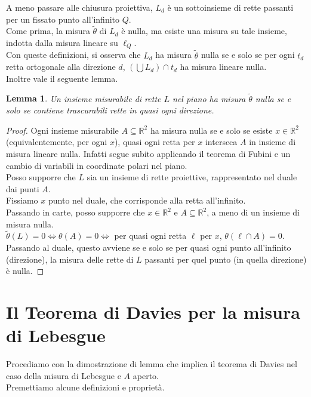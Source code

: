 \documentclass[a4paper, twoside,openright]{article}
\newcommand{\LRa}{\Leftrightarrow}
\newcommand{\R}{\mathbb{R}}
\newcommand{\<}{\langle}
\renewcommand{\>}{\rangle}
\newtheorem{lemma}[teo]{Lemma}
\begin{document}
A meno passare alle chiusura proiettiva, $L_{d}$ è un sottoinsieme di rette passanti per un fissato punto all'infinito $Q$.\\
Come prima, la misura $\tilde \theta$ di $L_d$ è nulla, ma esiste una misura su tale insieme, indotta dalla misura lineare su $\ell_Q$.\\
Con queste definizioni, si osserva che $L_d$ ha misura $\tilde \theta$ nulla se e solo se per ogni $t_d$ retta ortogonale alla direzione $d$, $ (\bigcup L_d) \cap t_d$ ha misura lineare nulla.\\
Inoltre vale il seguente lemma.

\begin{lemma}
	Un insieme misurabile di rette $L$ nel piano ha misura $\tilde \theta$ nulla se e solo se contiene trascurabili rette in quasi ogni direzione. 
\end{lemma}

\begin{proof}
	Ogni insieme misurabile $A \subseteq \R^2$ ha misura nulla se e solo se esiste $x \in \R^2$ (equivalentemente, per ogni $x$), quasi ogni retta per $x$ interseca $A$ in insieme di misura lineare nulla. Infatti segue subito applicando il teorema di Fubini e un cambio di variabili in coordinate polari nel piano.\\
	Posso supporre che $L$ sia un insieme di rette proiettive, rappresentato nel duale dai punti $A$.\\
	Fissiamo $x$ punto nel duale, che corrisponde alla retta all'infinito.\\
	Passando in carte, posso supporre che $x \in \R^2$ e $A\subseteq \R^2$, a meno di un insieme di misura nulla.\\
	$\tilde \theta (L)=0 \LRa \theta(A)=0 \LRa$ per quasi ogni retta $\ell$ per $x$, $\theta(\ell \cap A)=0$.\\
	Passando al duale, questo avviene se e solo se per quasi ogni punto all'infinito (direzione), la misura delle rette di $L$ passanti per quel punto (in quella direzione) è nulla.
\end{proof}	



	
\newpage

\section{Il Teorema di Davies per la misura di Lebesgue}

Procediamo con la dimostrazione di lemma che implica il teorema di Davies nel caso della misura di Lebesgue e $A$ aperto.\\
Premettiamo alcune definizioni e proprietà.
\end{document}

